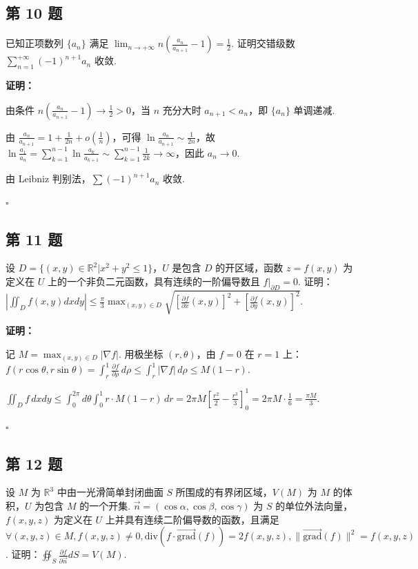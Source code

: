 \documentclass[12pt,a4paper]{article}
\newenvironment{sol}[1][解]{%
  \par\medskip\noindent\textbf{#1：}\itshape\par\noindent\ignorespaces
}{%
  \par\hfill$\square$\par\medskip
}
\begin{document}
\subsection*{第 10 题}
已知正项数列 $\{a_n\}$ 满足
$\lim_{n\rightarrow+\infty}n(\frac{a_n}{a_{n+1}}-1)=\frac{1}{2}$.
证明交错级数 $\sum_{n=1}^{+\infty}(-1)^{n+1}a_n$ 收敛.

\begin{sol}[证明]由条件 $n(\frac{a_n}{a_{n+1}}-1)\to\frac{1}{2}>0$，当 $n$ 充分大时
  $a_{n+1}<a_n$，即 $\{a_n\}$ 单调递减.

  由 $\frac{a_n}{a_{n+1}}=1+\frac{1}{2n}+o(\frac{1}{n})$，可得
  $\ln\frac{a_n}{a_{n+1}}\sim\frac{1}{2n}$，故
  $\ln\frac{a_1}{a_n}=\sum_{k=1}^{n-1}\ln\frac{a_k}{a_{k+1}}\sim\sum_{k=1}^{n-1}\frac{1}{2k}\to\infty$，因此
  $a_n\to 0$.

  由 Leibniz 判别法，$\sum(-1)^{n+1}a_n$ 收敛.
\end{sol}
\subsection*{第 11 题}
设 $D=\{(x,y)\in\mathbb{R}^2|x^2+y^2\le1\}$，$U$ 是包含 $D$ 的开区域，函数
$z=f(x,y)$ 为定义在 $U$ 上的一个非负二元函数，具有连续的一阶偏导数且 $f|_{\partial D}=0$.
证明：$\left|\iint_{D}f(x,y)dxdy\right|\le\frac{\pi}{3}\max_{(x,y)\in
D}\sqrt{\left[\frac{\partial f}{\partial
x}(x,y)\right]^2+\left[\frac{\partial f}{\partial y}(x,y)\right]^2}$.

\begin{sol}[证明]记 $M=\max_{(x,y)\in D}|\nabla f|$. 用极坐标 $(r,\theta)$，由
  $f=0$ 在 $r=1$ 上：
  $f(r\cos\theta,r\sin\theta)=\int_r^1\frac{\partial
  f}{\partial\rho}\,d\rho\le\int_r^1|\nabla f|\,d\rho\le M(1-r).$

  $\iint_D f\,dxdy\le\int_0^{2\pi}d\theta\int_0^1 r\cdot
  M(1-r)\,dr=2\pi M\left[\frac{r^2}{2}-\frac{r^3}{3}\right]_0^1=2\pi
  M\cdot\frac{1}{6}=\frac{\pi M}{3}.$
\end{sol}
\subsection*{第 12 题}
设 $M$ 为 $\mathbb{R}^3$ 中由一光滑简单封闭曲面 $S$ 所围成的有界闭区域，$V(M)$ 为 $M$ 的体积，$U$
为包含 $M$ 的一个开集. $\vec{n}=(\cos\alpha,\cos\beta,\cos\gamma)$ 为 $S$
的单位外法向量，$f(x,y,z)$ 为定义在 $U$ 上并具有连续二阶偏导数的函数，且满足 $\forall(x,y,z)\in M,
f(x,y,z)\ne0, \text{div}(f\cdot\vec{\text{grad}}(f))=2f(x,y,z),
\|\vec{\text{grad}}(f)\|^2=f(x,y,z)$. 证明：$\oiint_{S}\frac{\partial
f}{\partial \vec{n}}dS=V(M)$.
\end{document}
